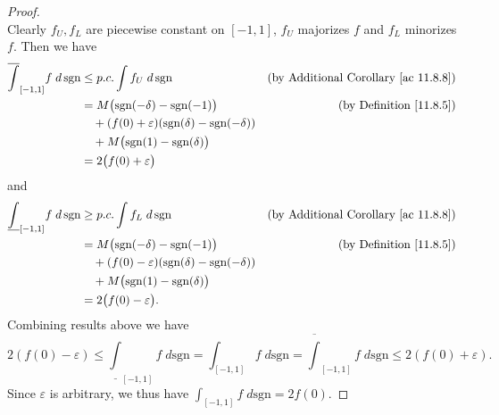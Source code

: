 \begin{proof}
\[    \]
    Clearly \(f_U, f_L\) are piecewise constant on \([-1, 1]\), \(f_U\) majorizes \(f\) and \(f_L\) minorizes \(f\).
    Then we have
    \begin{align*}
        \overline{\int}_{[-1, 1]} f \; d \, \text{sgn} & \leq p.c. \int f_U \; d \, \text{sgn}                                   & \text{(by Additional Corollary \ref{ac 11.8.8})} \\
                                                       & = M \big(\text{sgn}(-\delta) - \text{sgn}(-1)\big)                      & \text{(by Definition \ref{11.8.5})}              \\
                                                       & \quad + (f(0) + \varepsilon) (\text{sgn}(\delta) - \text{sgn}(-\delta))                                                    \\
                                                       & \quad + M \big(\text{sgn}(1) - \text{sgn}(\delta)\big)                                                                     \\
                                                       & = 2\big(f(0) + \varepsilon\big)
    \end{align*}
    and
    \begin{align*}
        \underline{\int}_{[-1, 1]} f \; d \, \text{sgn} & \geq p.c. \int f_L \; d \, \text{sgn}                                   & \text{(by Additional Corollary \ref{ac 11.8.8})} \\
                                                        & = M \big(\text{sgn}(-\delta) - \text{sgn}(-1)\big)                      & \text{(by Definition \ref{11.8.5})}              \\
                                                        & \quad + (f(0) - \varepsilon) (\text{sgn}(\delta) - \text{sgn}(-\delta))                                                    \\
                                                        & \quad + M \big(\text{sgn}(1) - \text{sgn}(\delta)\big)                                                                     \\
                                                        & = 2\big(f(0) - \varepsilon\big).
    \end{align*}
    Combining results above we have
    \[
        2(f(0) - \varepsilon) \leq \underline{\int}_{[-1, 1]} f \; d \text{sgn} = \int_{[-1, 1]} f \; d \text{sgn} = \overline{\int}_{[-1, 1]} f \; d \text{sgn} \leq 2(f(0) + \varepsilon).
    \]
    Since \(\varepsilon\) is arbitrary, we thus have \(\int_{[-1, 1]} f \; d \text{sgn} = 2f(0)\).
\end{proof}